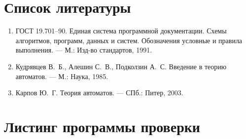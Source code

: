 \documentclass[a4paper,14pt]{extarticle}
\begin{document}
\section*{Список литературы}
\begin{enumerate}
\item ГОСТ 19.701--90. Единая система программной документации. Схемы
      алгоритмов, программ, данных и систем. Обозначения условные и правила
      выполнения. --- М.: Изд-во стандартов, 1991.
\item Кудрявцев В.~Б., Алешин С.~В., Подколзин А.~С. Введение в теорию
      автоматов. --- М.: Наука, 1985.
\item Карпов Ю.~Г. Теория автоматов. --- СПб.: Питер, 2003.
\end{enumerate}

\newpage
\appendix
\section{Листинг программы проверки}
\end{document}
